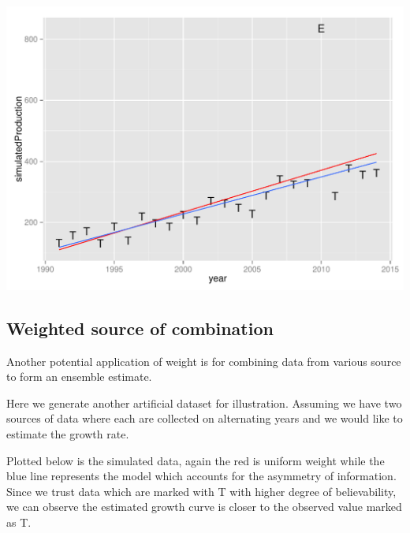 \documentclass[nojss]{jss}\usepackage[]{graphicx}\usepackage[]{color}
\makeatletter
\def\maxwidth{ %
  \ifdim\Gin@nat@width>\linewidth
    \linewidth
  \else
    \Gin@nat@width
  \fi
}
\newenvironment{knitrout}{}{} %
\makeatother
\begin{document}
\begin{knitrout}
{\centering \includegraphics[width=\maxwidth]{figure/simulated-example} 

}



\end{knitrout}


\subsection{Weighted source of combination}

Another potential application of weight is for combining data from
various source to form an ensemble estimate.

Here we generate another artificial dataset for illustration. Assuming
we have two sources of data where each are collected on alternating
years and we would like to estimate the growth rate.

Plotted below is the simulated data, again the red is uniform weight
while the blue line represents the model which accounts for the
asymmetry of information. Since we trust data which are marked with T
with higher degree of believability, we can observe the estimated
growth curve is closer to the observed value marked as T.
\end{document}
